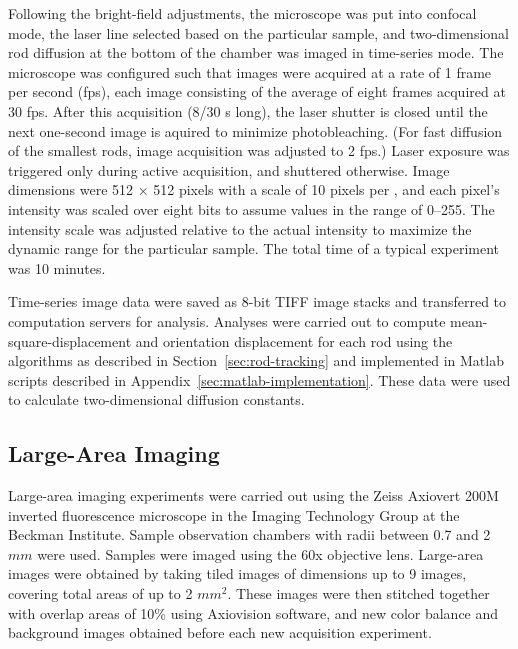 Following the bright-field adjustments, the microscope was put into confocal mode, the laser line selected 
based on the particular sample, and two-dimensional rod diffusion at the 
bottom of the chamber was imaged in time-series mode.  The microscope was configured such that images were acquired at
a rate of 1 frame per second (fps), 
each image consisting of the average of eight frames acquired at 30 fps.  
After this acquisition (8/30 s long), the laser shutter is closed until the next one-second image is aquired
to minimize photobleaching.
(For fast diffusion of the smallest rods,
image acquisition was adjusted to 2 fps.)  Laser exposure was triggered only during active 
acquisition, and shuttered otherwise.  Image dimensions were 512 $\times$ 512 pixels with a scale of 10 pixels
per \microns, and each pixel's intensity was scaled over eight bits to assume values in the range of 0--255.
The intensity scale was adjusted relative to the actual intensity to maximize the dynamic range for the particular sample.
The total time of a typical experiment was 10 minutes.

Time-series image data were saved as 8-bit TIFF image stacks and transferred to computation servers for analysis.
Analyses were carried out to compute mean-square-displacement and orientation displacement for each rod using 
the algorithms as 
described in Section~\ref{sec:rod-tracking} and implemented in Matlab scripts described in 
Appendix~\ref{sec:matlab-implementation}.
These data
were used to calculate two-dimensional diffusion constants.  

\subsection{Large-Area Imaging}
\label{sec:tiled-microscopy}

Large-area imaging experiments were carried out using the 
Zeiss Axiovert 200M inverted fluorescence microscope in the Imaging Technology Group
at the Beckman Institute.  Sample observation chambers with radii between 0.7 and 2 $mm$ were used.
Samples were imaged using the 60x objective lens.  Large-area images were obtained by taking tiled images of dimensions 
up to 9  images, covering total areas of up to 2 $mm^2$.  These images were then stitched together with overlap 
areas of 10\% using Axiovision 
software, and new color balance and background images obtained before each new acquisition experiment.

